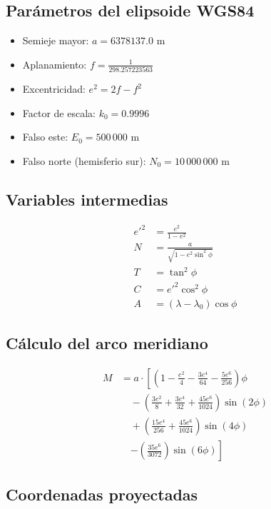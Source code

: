 \documentclass[12pt]{article}
\begin{document}
\subsection*{Parámetros del elipsoide WGS84}

\begin{itemize}
  \item Semieje mayor: $a = 6378137.0$ m
  \item Aplanamiento: $f = \frac{1}{298.257223563}$
  \item Excentricidad: $e^2 = 2f - f^2$
  \item Factor de escala: $k_0 = 0.9996$
  \item Falso este: $E_0 = 500\,000$ m
  \item Falso norte (hemisferio sur): $N_0 = 10\,000\,000$ m
\end{itemize}

\subsection*{Variables intermedias}

\begin{align*}
e'^2 &= \frac{e^2}{1 - e^2} \\
N &= \frac{a}{\sqrt{1 - e^2 \sin^2 \phi}} \\
T &= \tan^2 \phi \\
C &= e'^2 \cos^2 \phi \\
A &= (\lambda - \lambda_0) \cos \phi
\end{align*}

\subsection*{Cálculo del arco meridiano}

\begin{align*}
M &= a \cdot \left[
(1 - \frac{e^2}{4} - \frac{3e^4}{64} - \frac{5e^6}{256}) \phi \right. \\
&\quad - (\frac{3e^2}{8} + \frac{3e^4}{32} + \frac{45e^6}{1024}) \sin(2\phi) \\
&\quad + (\frac{15e^4}{256} + \frac{45e^6}{1024}) \sin(4\phi) \\
&\quad \left. - (\frac{35e^6}{3072}) \sin(6\phi)
\right]
\end{align*}

\subsection*{Coordenadas proyectadas}
\end{document}
